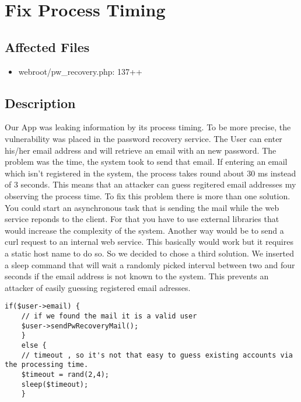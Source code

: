 \chapter{Fix Process Timing}
\section{Affected Files}
\begin{itemize}
	\item webroot/pw\_recovery.php: 137++
\end{itemize}
\section{Description}

Our App was leaking information by its process timing. To be more precise, the vulnerability was placed in the password recovery service. The User can enter his/her email address and will retrieve an email with an new password. The problem was the time, the system took to send that email. If entering an email which isn't registered in the system, the process takes round about 30 ms instead of 3 seconds. This means that an attacker can guess regitered email addresses my observing the process time. To fix this problem there is more than one solution. You could start an asynchronous task that is sending the mail while the web service reponds to the client. For that you have to use external libraries that would increase the complexity of the system. Another way would be to send a curl request to an internal web service. This basically would work but it requires a static host name to do so. So we decided to chose a third solution. We inserted a sleep command that will wait a randomly picked interval between two and four seconds if the email address is not known to the system. This prevents an attacker of easily guessing registered email adresses.

\begin{lstlisting}[caption=Random Timeout in pw\_recovery.php,label=listing:timeout]
	if($user->email) {
	// if we found the mail it is a valid user
	$user->sendPwRecoveryMail();
	}
	else {
	// timeout , so it's not that easy to guess existing accounts via the processing time.
	$timeout = rand(2,4);
	sleep($timeout);
	}
\end{lstlisting}
